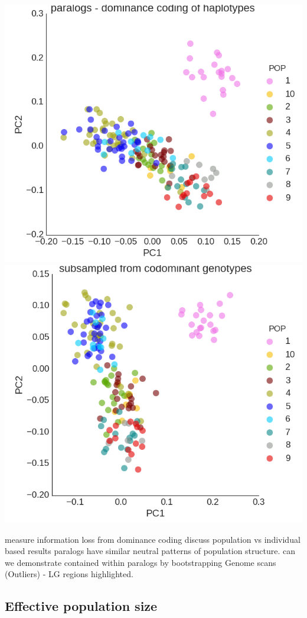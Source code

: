 \documentclass[12pt,  one column]{article}
\begin{document}
\includegraphics[scale=.3]{figures/PCA_dom_paralogs.png}
\includegraphics[scale=.3]{figures/PCA_codom_subsample.png}


measure information loss from dominance coding
discuss population vs individual based results
paralogs have similar neutral patterns of population structure.
can we demonstrate contained within paralogs by bootstrapping 
Genome scans (Outliers) - LG regions highlighted.

\subsection*{Effective population size}
\end{document}
